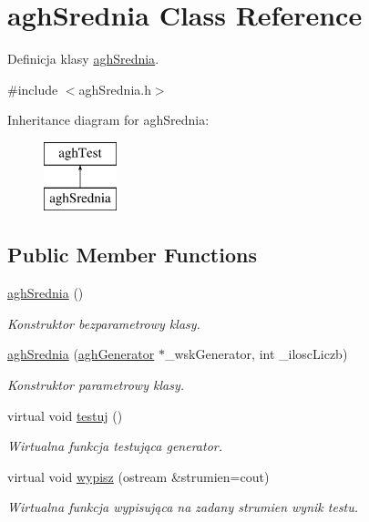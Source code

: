 \hypertarget{classaghSrednia}{\section{agh\-Srednia \-Class \-Reference}
\label{classaghSrednia}
}


\-Definicja klasy \hyperlink{classaghSrednia}{agh\-Srednia}.  




{\ttfamily \#include $<$agh\-Srednia.\-h$>$}

\-Inheritance diagram for agh\-Srednia\-:\begin{figure}[H]
\begin{center}
\leavevmode
\includegraphics[height=2.000000cm]{classaghSrednia}
\end{center}
\end{figure}
\subsection*{\-Public \-Member \-Functions}
\begin{DoxyCompactItemize}
\item 
\hypertarget{classaghSrednia_a618c328f4f94e358bf8a6a09db4e992c}{\hyperlink{classaghSrednia_a618c328f4f94e358bf8a6a09db4e992c}{agh\-Srednia} ()}\label{classaghSrednia_a618c328f4f94e358bf8a6a09db4e992c}

\begin{DoxyCompactList}\small\item\em \-Konstruktor bezparametrowy klasy. \end{DoxyCompactList}\item 
\hyperlink{classaghSrednia_a8cadd31f7df514a19544561793b774b1}{agh\-Srednia} (\hyperlink{classaghGenerator}{agh\-Generator} $\ast$\-\_\-wsk\-Generator, int \-\_\-ilosc\-Liczb)
\begin{DoxyCompactList}\small\item\em \-Konstruktor parametrowy klasy. \end{DoxyCompactList}\item 
\hypertarget{classaghSrednia_a5b9c95e4cb2fcbd0c905bfe6839dedd4}{virtual void \hyperlink{classaghSrednia_a5b9c95e4cb2fcbd0c905bfe6839dedd4}{testuj} ()}\label{classaghSrednia_a5b9c95e4cb2fcbd0c905bfe6839dedd4}

\begin{DoxyCompactList}\small\item\em \-Wirtualna funkcja testująca generator. \end{DoxyCompactList}\item 
virtual void \hyperlink{classaghSrednia_ab66006aa06658abf55422d3629cf95f5}{wypisz} (ostream \&strumien=cout)
\begin{DoxyCompactList}\small\item\em \-Wirtualna funkcja wypisująca na zadany strumien wynik testu. \end{DoxyCompactList}\end{DoxyCompactItemize}



